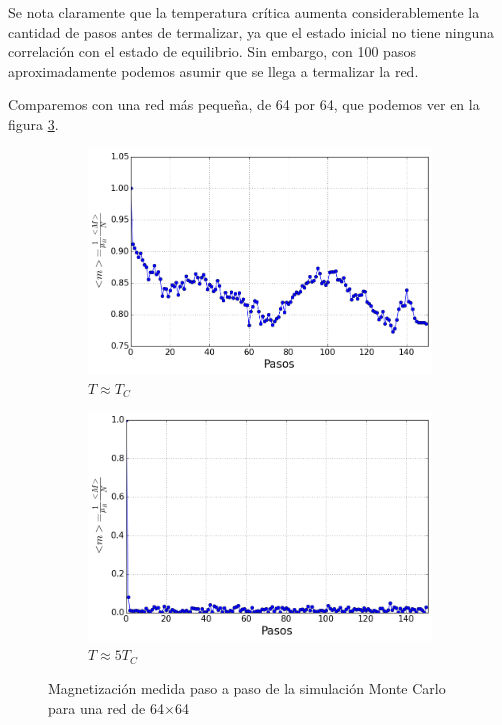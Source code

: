 \documentclass[12pt,a4paper]{article}
\begin{document}
Se nota claramente que la temperatura crítica aumenta considerablemente la cantidad de pasos antes de termalizar, ya que el estado inicial no tiene ninguna correlación con el estado de equilibrio. Sin embargo, con 100 pasos aproximadamente podemos asumir que se llega a termalizar la red.

Comparemos con una red más pequeña, de 64 por 64, que podemos ver en la figura \ref{fig:term_64}.

\begin{figure}[H]
\begin{subfigure}[c]{0.45\textwidth}
\centering
\includegraphics[width=\textwidth]{termalizado/term_L_64_tc.png}
\caption{$T \approx T_C$}
\label{fig:term_64_tc}
\end{subfigure}
\begin{subfigure}[c]{0.45\textwidth}
\centering
\includegraphics[width=\textwidth]{termalizado/term_L_64_5tc.png}
\caption{$T \approx 5 T_C$}
\label{fig:term_64_5tc}
\end{subfigure}
\caption{Magnetización medida paso a paso de la simulación Monte Carlo para una red de 64$\times$64}
\label{fig:term_64}
\end{figure}
\end{document}
